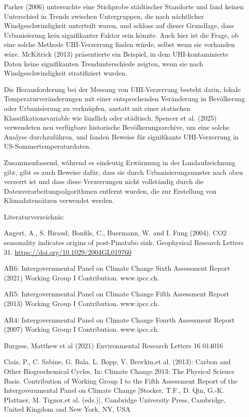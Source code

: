 \documentclass[12pt,paper=a4,DIV=12,parskip=never,chapterprefix=false,headings=standardclasses]{scrreprt}
\numberwithin{figure}{chapter}
\begin{document}
Parker (2006) untersuchte eine Stichprobe städtischer Standorte und fand keinen Unterschied in Trends zwischen Untergruppen, die nach nächtlicher Windgeschwindigkeit unterteilt waren, und schloss auf dieser Grundlage, dass Urbanisierung kein signifikanter Faktor sein könnte. Auch hier ist die Frage, ob eine solche Methode UHI-Verzerrung finden würde, selbst wenn sie vorhanden wäre. McKitrick (2013) präsentierte ein Beispiel, in dem UHI-kontaminierte Daten keine signifikanten Trendunterschiede zeigten, wenn sie nach Windgeschwindigkeit stratifiziert wurden.

Die Herausforderung bei der Messung von UHI-Verzerrung besteht darin, lokale Temperaturveränderungen mit einer entsprechenden Veränderung in Bevölkerung oder Urbanisierung zu verknüpfen, anstatt mit einer statischen Klassifikationsvariable wie ländlich oder städtisch. Spencer et al. (2025) verwendeten neu verfügbare historische Bevölkerungsarchive, um eine solche Analyse durchzuführen, und fanden Beweise für signifikante UHI-Verzerrung in US-Sommertemperaturdaten.

Zusammenfassend, während es eindeutig Erwärmung in der Landaufzeichnung gibt, gibt es auch Beweise dafür, dass sie durch Urbanisierungsmuster nach oben verzerrt ist und dass diese Verzerrungen nicht vollständig durch die Datenverarbeitungsalgorithmen entfernt wurden, die zur Erstellung von Klimadatensätzen verwendet werden.

Literaturverzeichnis:

Angert, A., S. Biraud, Bonfils, C., Buermann, W. and I. Fung (2004). CO2 seasonality indicates origins of
post-Pinatubo sink. Geophysical Research Letters 31. \url{https://doi.org/10.1029/2004GL019760}

AR6: Intergovernmental Panel on Climate Change Sixth Assessment Report (2021) Working Group I
Contribution. www.ipcc.ch.

AR5: Intergovernmental Panel on Climate Change Fifth Assessment Report (2013) Working Group I
Contribution. www.ipcc.ch.

AR4: Intergovernmental Panel on Climate Change Fourth Assessment Report (2007) Working Group I
Contribution. www.ipcc.ch.

Burgess, Matthew et al (2021) Environmental Research Letters 16 014016
\url{}

Ciais, P., C. Sabine, G. Bala, L. Bopp, V. Brovkin,et al. (2013): Carbon and Other Biogeochemical Cycles.
In: Climate Change 2013: The Physical Science Basis. Contribution of Working Group I to the Fifth
Assessment Report of the Intergovernmental Panel on Climate Change [Stocker, T.F., D. Qin, G.-K.
Plattner, M. Tignor,et al. (eds.)]. Cambridge University Press, Cambridge, United Kingdom and New
York, NY, USA
\end{document}
